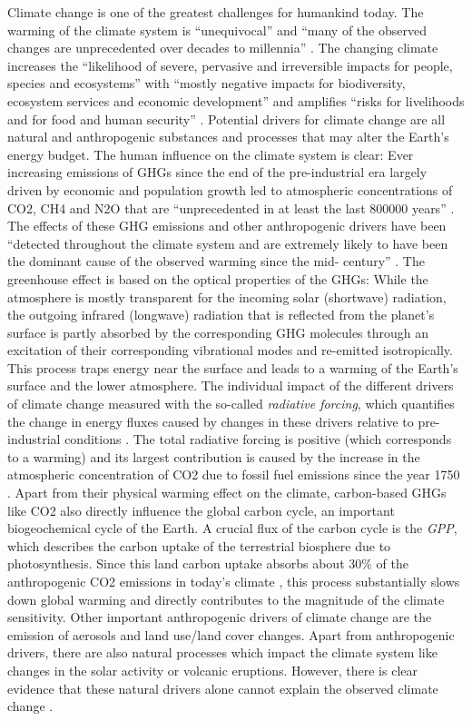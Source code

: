 Climate change is one of the greatest challenges for humankind today. The
warming of the climate system is \enquote{unequivocal} and \enquote{many of the
  observed changes are unprecedented over decades to millennia}
\autocite{IPCC2014}. The changing climate increases the \enquote{likelihood of
  severe, pervasive and irreversible impacts for people, species and
  ecosystems} with \enquote{mostly negative impacts for biodiversity, ecosystem
services and economic development} and amplifies \enquote{risks for
livelihoods and for food and human security} \autocite{IPCC2014}. Potential
drivers for climate change are all natural and anthropogenic substances and
processes that may alter the Earth's energy budget. The human influence on
the climate system is clear: Ever increasing emissions of \acp{GHG} since the
end of the pre-industrial era largely driven by economic and population
growth led to atmospheric concentrations of \ac{CO2}, \ac{CH4} and \ac{N2O}
that are \enquote{unprecedented in at least the last 800000 years}
\autocite{IPCC2014}. The effects of these \ac{GHG} emissions and other
anthropogenic drivers have been \enquote{detected throughout the climate
system and are extremely likely to have been the dominant cause of the
observed warming since the mid- century} \autocite{IPCC2014}. The
greenhouse effect is based on the optical properties of the \acp{GHG}: While
the atmosphere is mostly transparent for the incoming solar (shortwave)
radiation, the outgoing infrared (longwave) radiation that is reflected from
the planet's surface is partly absorbed by the corresponding \ac{GHG}
molecules through an excitation of their corresponding vibrational modes and
re-emitted isotropically. This process traps energy near the surface and
leads to a warming of the Earth's surface and the lower atmosphere. The
individual impact of the different drivers of climate change measured with
the so-called \emph{radiative forcing}, which quantifies the change in energy
fluxes caused by changes in these drivers relative to pre-industrial
conditions \autocite{IPCC2013}. The total radiative forcing is positive
(which corresponds to a warming) and its largest contribution is caused by
the increase in the atmospheric concentration of \ac{CO2} due to fossil fuel
emissions since the year 1750 \autocite{IPCC2014}. Apart from their physical
warming effect on the climate, carbon-based \acp{GHG} like \ac{CO2} also
directly influence the global carbon cycle, an important biogeochemical cycle
of the Earth. A crucial flux of the carbon cycle is the \emph{\ac{GPP}},
which describes the carbon uptake of the terrestrial biosphere due to
photosynthesis. Since this land carbon uptake absorbs about $30 \unit{\%}$ of
the anthropogenic \ac{CO2} emissions in today's climate
\autocite{Friedlingstein2020}, this process substantially slows down global
warming and directly contributes to the magnitude of the climate sensitivity.
Other important anthropogenic drivers of climate change are the emission of
aerosols and land use/land cover changes. Apart from anthropogenic drivers,
there are also natural processes which impact the climate system like changes
in the solar activity or volcanic eruptions. However, there is clear evidence
that these natural drivers alone cannot explain the observed climate change
\autocite{Haustein2017}.

